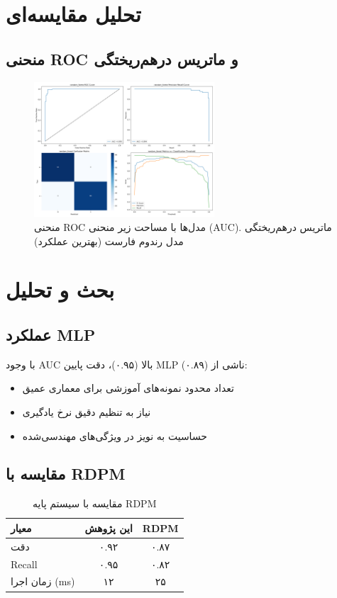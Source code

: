 \section{تحلیل مقایسه‌ای}


\subsection{منحنی ROC و ماتریس درهم‌ریختگی}
\begin{figure}[h]
    \centering
    \includegraphics[width=0.6\textwidth]{images/random_forest_plots.png}
    \caption{منحنی ROC مدل‌ها با مساحت زیر منحنی (AUC). ماتریس درهم‌ریختگی مدل رندوم فارست (بهترین عملکرد)}
    \label{fig:conf_matـroc}
\end{figure}

\section{بحث و تحلیل}
\subsection{عملکرد MLP}
با وجود AUC بالا (۰.۹۵)، دقت پایین MLP (۰.۸۹) ناشی از:
\begin{itemize}
    \item تعداد محدود نمونه‌های آموزشی برای معماری عمیق
    \item نیاز به تنظیم دقیق نرخ یادگیری
    \item حساسیت به نویز در ویژگی‌های مهندسی‌شده
\end{itemize}

\subsection{مقایسه با RDPM}
\begin{table}[h]
    \centering
    \begin{tabular}{|l|c|c|}
        \hline
        \textbf{معیار} & \textbf{این پژوهش} & \textbf{RDPM} \\ \hline
        دقت & ۰.۹۲ & ۰.۸۷ \\ \hline
        Recall & ۰.۹۵ & ۰.۸۲ \\ \hline
        زمان اجرا (ms) & ۱۲ & ۲۵ \\ \hline
    \end{tabular}
    \caption{مقایسه با سیستم پایه RDPM}
\end{table}